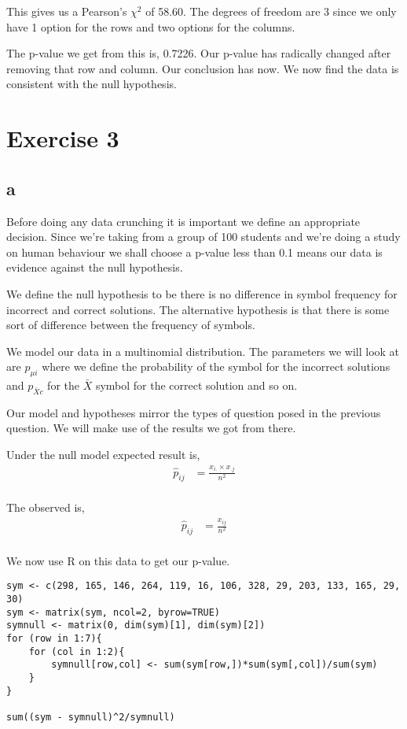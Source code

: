 \documentclass{article}
\begin{document}
This gives us a Pearson's $\chi^2$ of 58.60. The degrees of freedom are 3
since we only have 1 option for the rows and two options for the columns.

The p-value we get from this is, 0.7226. Our p-value has radically changed after
removing that row and column. Our conclusion has now. We now find the data 
is consistent with the null hypothesis.

\section{Exercise 3}
\subsection{a}
Before doing any data crunching it is important we define an appropriate
decision. Since we're taking from a group of 100 students and we're doing a
study on human behaviour we shall choose a p-value less than 0.1 means our data
is evidence against the null hypothesis.

We define the null hypothesis to be there is no difference in symbol frequency
for incorrect and correct solutions. The alternative hypothesis is that there is
some sort of difference between the frequency of symbols.

We model our data in a multinomial distribution.
The parameters we will look at are $p_{\mu i}$ where we define the probability
of the symbol for the incorrect solutions and $p_{\bar{X} c}$ for the $\bar{X}$
symbol for the correct solution and so on.

Our model and hypotheses mirror the types of question posed in the previous
question. We will make use of the results we got from there.

Under the null model expected result is,
\begin{align*}
    \hat{p}_{ij} &= \frac{x_{i.} \times x_{.j}}{n^2} \\
\end{align*}

The observed is,
\begin{align*}
    \hat{p}_{ij} &= \frac{x_{ij}}{n^2} \\
\end{align*}

We now use R on this data to get our p-value.
\begin{verbatim}
sym <- c(298, 165, 146, 264, 119, 16, 106, 328, 29, 203, 133, 165, 29, 30)
sym <- matrix(sym, ncol=2, byrow=TRUE)
symnull <- matrix(0, dim(sym)[1], dim(sym)[2])
for (row in 1:7){
    for (col in 1:2){
        symnull[row,col] <- sum(sym[row,])*sum(sym[,col])/sum(sym)
    }
}

sum((sym - symnull)^2/symnull)
\end{verbatim}
\end{document}
